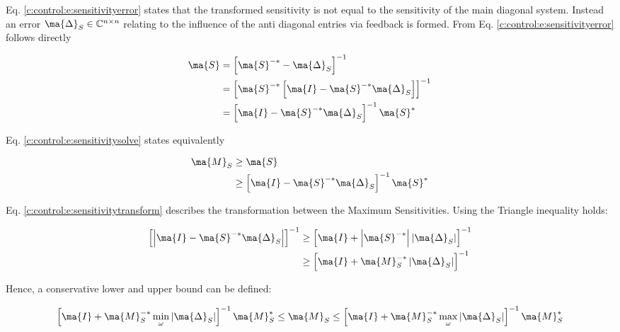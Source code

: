 Eq. \ref{c:control:e:sensitivityerror} states that the transformed sensitivity is not equal to the sensitivity of the main diagonal system. Instead an error $\ma{\Delta}_{S} \in \mathbb{C}^{n \times n}$ relating to the influence of the anti diagonal entries via feedback is formed. From Eq. \ref{c:control:e:sensitivityerror} follows directly

\begin{align}
\begin{split}
\ma{S} &= \left[ \ma{S}^{-*}- \ma{\Delta}_{S}\right]^{-1} \\
&= \left[ \ma{S}^{-*}\left[ \ma{I} - \ma{S}^{-*}\ma{\Delta}_S\right] \right]^{-1} \\
&= \left[ \ma{I} - \ma{S}^{-*}\ma{\Delta}_S\right]^{-1} \ma{S}^{*}
\end{split}
\label{c:control:e:sensitivitysolve}
\end{align}

Eq. \ref{c:control:e:sensitivitysolve} states equivalently

\begin{align}
\begin{split}
\ma{M}_S &\geq \ma{S} \\
&\geq \left[ \ma{I} - \ma{S}^{-*}\ma{\Delta}_S\right]^{-1} \ma{S}^{*}
\end{split}
\label{c:control:e:sensitivitytransform}
\end{align}

Eq. \ref{c:control:e:sensitivitytransform} describes the transformation between the Maximum Sensitivities. 
Using the Triangle inequality holds:

\begin{align}
\begin{split}
\left[\left| \ma{I} - \ma{S}^{-*} \ma{\Delta}_S  \right| \right]^{-1} &\geq \left[\ma{I} + \left|\ma{S}^{-*} \right| \left| \ma{\Delta}_S  \right| \right]^{-1} \\
&\geq \left[\ma{I} + \ma{M}_S^{-*} \left| \ma{\Delta}_S  \right| \right]^{-1} 
\end{split}
\end{align}

Hence, a conservative lower and upper bound can be defined:

\begin{align}
\begin{split}
\left[\ma{I} + \ma{M}_S^{-*} \min_\omega \left|\ma{\Delta}_{S}\right| \right]^{-1} \ma{M}_S^{*}\leq \ma{M}_S \leq 
\left[\ma{I} + \ma{M}_S^{-*} \max_\omega \left|\ma{\Delta}_{S}\right| \right]^{-1} \ma{M}_S^{*}
\end{split}
\label{c:control:e:sensitivitytransformBounds}
\end{align}

